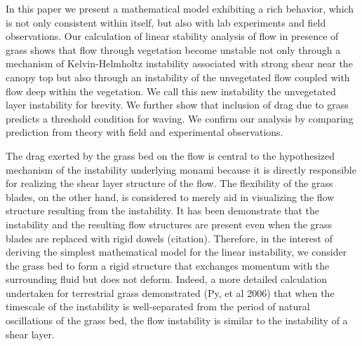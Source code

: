 \documentclass[aps,prl,twocolumn,showpacs,superscriptaddress,groupedaddress,10pt]{revtex4-1}  %
\begin{document}
In this paper we present a mathematical model exhibiting a rich behavior, which is not only consistent within itself, but also with lab experiments and field observations. Our calculation of linear stability analysis of flow in presence of grass shows that flow through vegetation become unstable not only through a mechanism of Kelvin-Helmholtz instability associated with strong shear near the canopy top but also through an instability of the unvegetated flow coupled with flow deep within the vegetation. We call this new instability the unvegetated layer instability for brevity. We further show that inclusion of drag due to grass predicts a threshold condition for waving. We confirm our analysis by comparing prediction from theory with field and experimental observations.

The drag exerted by the grass bed on the flow is central to the hypothesized mechanism\cite{Ghisal02} of the instability underlying monami because it is directly responsible for realizing the shear layer structure of the flow. The flexibility of the grass blades, on the other hand, is considered to merely aid in visualizing the flow structure resulting from the instability. It has been demonstrate that the instability and the resulting flow structures are present even when the grass blades are replaced with rigid dowels (citation). Therefore, in the interest of deriving the simplest mathematical model for the linear instability, we consider the grass bed to form a rigid structure that exchanges momentum with the surrounding fluid but does not deform. Indeed, a more detailed calculation undertaken for terrestrial grass demonstrated (Py, et al 2006) that when the timescale of the instability is well-separated from the period of natural oscillations of the grass bed, the flow instability is similar to the instability of a shear layer. 
\end{document}
